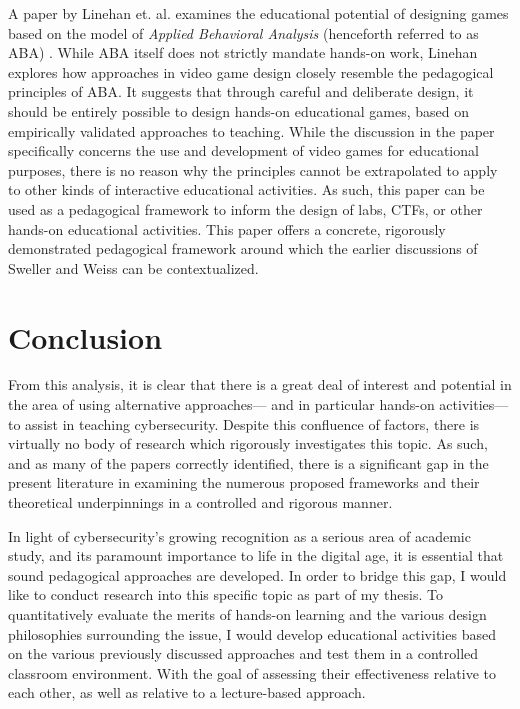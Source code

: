    A paper by Linehan et. al. examines the educational potential of designing games based on the model of \emph{Applied Behavioral Analysis} (henceforth referred to as ABA) \cite{C-Linehan}. %
While ABA itself does not strictly mandate hands-on work, Linehan explores how approaches in video game design closely resemble the pedagogical principles of ABA. It suggests that through careful and deliberate design, it should be entirely possible to design hands-on educational games, based on empirically validated approaches to teaching. %
While the discussion in the paper specifically concerns the use and development of video games for educational purposes, there is no reason why the principles cannot be extrapolated to apply to other kinds of interactive educational activities. %
As such, this paper can be used as a pedagogical framework to inform the design of labs, CTFs, or other hands-on educational activities. %
This paper offers a concrete, rigorously demonstrated pedagogical framework around which the earlier discussions of Sweller and Weiss can be contextualized. 

\section{Conclusion}

    From this analysis, it is clear that there is a great deal of interest and potential in the area of using alternative approaches---%
and in particular hands-on activities---%
to assist in teaching cybersecurity. %
Despite this confluence of factors, there is virtually no body of research which rigorously investigates this topic. %
As such, and as many of the papers correctly identified, there is a significant gap in the present literature in examining the numerous proposed frameworks and their theoretical underpinnings in a controlled and rigorous manner. 

    In light of cybersecurity's growing recognition as a serious area of academic study, and its paramount importance to life in the digital age, it is essential that sound pedagogical approaches are developed. %
In order to bridge this gap, I would like to conduct research into this specific topic as part of my thesis. %
To quantitatively evaluate the merits of hands-on learning and the various design philosophies surrounding the issue, I would develop educational activities based on the various previously discussed approaches and test them in a controlled classroom environment. %
With the goal of assessing their effectiveness relative to each other, as well as relative to a lecture-based approach. 
